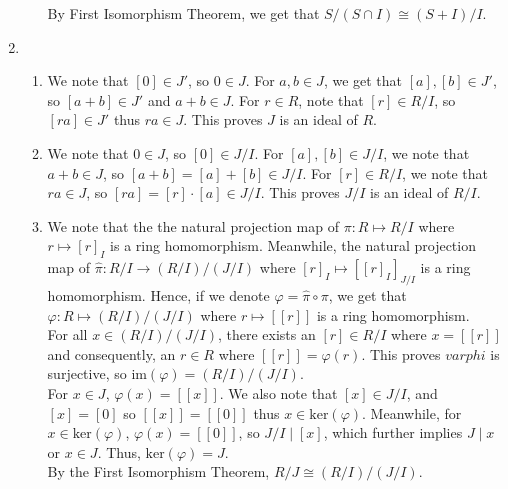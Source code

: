\documentclass{article}
\begin{document}
\begin{enumerate}
\begin{enumerate}
    By First Isomorphism Theorem, we get that $S / (S \cap I) \cong (S + I)/I$. 

\end{enumerate}

\newpage

\item
\begin{enumerate}
    \item 
    We note that $[0] \in J'$, so $0 \in J$. For $a, b \in J$, we get that $[a], [b] \in J'$, so $[a + b] \in J'$ and $a + b \in J$. For $r \in R$, note that $[r] \in R/I$, so $[ra] \in J'$ thus $ra \in J$. This proves $J$ is an ideal of $R$. \\

    \item 
    We note that $0 \in J$, so $[0] \in J/I$. For $[a], [b] \in J/I$, we note that $a + b \in J$, so $[a + b] = [a] + [b] \in J/I$. For $[r] \in R/I$, we note that $ra \in J$, so $[ra] = [r] \cdot [a] \in J/I$. This proves $J/I$ is an ideal of $R/I$. \\

    \item
    We note that the the natural projection map of $\pi: R \mapsto R/I$ where $r \mapsto [r]_I$ is a ring homomorphism. Meanwhile, the natural projection map of $\hat{\pi}: R/I \rightarrow (R/I)/(J/I)$ where $[r]_I \mapsto [[r]_I]_{J/I}$ is a ring homomorphism. Hence, if we denote $\varphi = \hat{\pi} \circ \pi$, we get that $\varphi: R \mapsto (R/I)/(J/I)$ where $r \mapsto [[r]]$ is a ring homomorphism. \\

    For all $x \in (R/I)/(J/I)$, there exists an $[r] \in R/I$ where $x = [[r]]$ and consequently, an $r \in R$ where $[[r]] = \varphi(r)$. This proves $varphi$ is surjective, so $\text{im}{(\varphi)} = (R/I)/(J/I)$. \\

    For $x \in J$, $\varphi(x) = [[x]]$. We also note that $[x] \in J/I$, and $[x] = [0]$ so $[[x]] = [[0]]$ thus $x \in \text{ker}(\varphi)$. Meanwhile, for $x \in \text{ker}(\varphi)$, $\varphi(x) = [[0]]$, so $J/I \mid [x]$, which further implies $J \mid x$ or $x \in J$. Thus, $\text{ker}(\varphi) = J$. \\

    By the First Isomorphism Theorem, $R/J \cong (R/I) / (J/I)$. 

\end{enumerate}

\newpage 


\end{enumerate}
\end{document}
